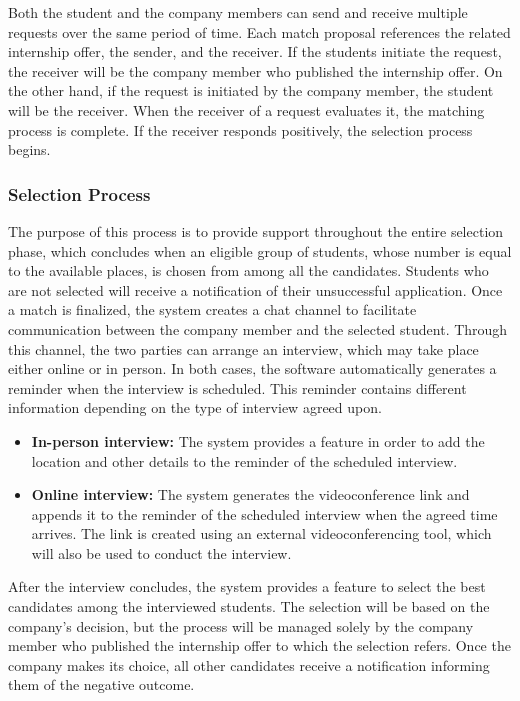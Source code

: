 Both the student and the company members can send and receive multiple requests over the same period of time. Each match proposal references the related internship offer, 
the sender, and the receiver. If the students initiate the request, the receiver will be the company member who published the internship offer. On the other hand, 
if the request is initiated by the company member, the student will be the receiver.
When the receiver of a request evaluates it, the matching process is complete. If the receiver responds positively, the selection process begins.

\subsubsection{Selection Process}

The purpose of this process is to provide support throughout the entire selection phase, which concludes when an eligible group of students, whose number is equal to the available places, is chosen from among all the candidates.
Students who are not selected will receive a notification of their unsuccessful application.
Once a match is finalized, the system creates a chat channel to facilitate communication between the company member and the selected student.
Through this channel, the two parties can arrange an interview, which may take place either online or in person. In both cases, 
the software automatically generates a reminder when the interview is scheduled. This reminder contains different information depending on the type of interview agreed upon.

\begin{itemize}
    \item \textbf{In-person interview:} The system provides a feature in order to add the location and other details to the reminder of the scheduled interview.  
    \item \textbf{Online interview:} The system generates the videoconference link and appends it to the reminder of the scheduled interview when the agreed time arrives.
    The link is created using an external videoconferencing tool, which will also be used to conduct the interview.  
\end{itemize}

After the interview concludes, the system provides a feature to select the best candidates among the interviewed students. The selection will be based on the company's 
decision, but the process will be managed solely by the company member who published the internship offer to which the selection refers. Once the company makes 
its choice, all other candidates receive a notification informing them of the negative outcome.

